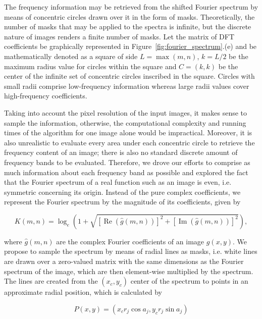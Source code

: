 The frequency information may be retrieved from the shifted Fourier spectrum by means of concentric circles drawn over it in the form of masks. Theoretically, the number of masks that may be applied to the spectra is infinite, but the discrete nature of images renders a finite number of masks. Let the matrix of DFT coefficients be graphically represented in Figure~\ref{fig:fourier_spectrum}.(e) and be mathematically denoted as a square of side $L = \max{(m,n)}$, $k = L / 2$ be the maximum radius value for circles within the square and $C = (k,k)$ be the center of the infinite set of concentric circles inscribed in the square. Circles with small radii comprise low-frequency information whereas large radii values cover high-frequency coefficients.

Taking into account the pixel resolution of the input images, it makes sense to sample the information, otherwise, the computational complexity and running times of the algorithm for one image alone would be impractical. Moreover, it is also unrealistic to evaluate every area under each concentric circle to retrieve the frequency content of an image; there is also no standard discrete amount of frequency bands to be evaluated. Therefore, we drove our efforts to comprise as much information about each frequency band as possible and explored the fact that the Fourier spectrum of a real function such as an image is even, i.e. symmetric concerning its origin. Instead of the pure complex coefficients, we represent the Fourier spectrum by the magnitude of its coefficients, given by

\begin{equation}
\label{eqn:magnitude_of_DFT}
K(m,n) = 
    \log_{e}{\left(1
    + \sqrt{
        [\operatorname{Re}{(\hat{g}(m,n))}]^{2}
        + [\operatorname{Im}{(\hat{g}(m,n))}]^{2}
      }
    \right)},
\end{equation}

\noindent where $\hat{g}(m,n)$ are the complex Fourier coefficients of an image $g(x,y)$. We propose to sample the spectrum by means of radial lines as masks, i.e. white lines are drawn over a zero-valued matrix with the same dimensions as the Fourier spectrum of the image, which are then element-wise multiplied by the spectrum. The lines are created from the $(x_{c},y_{c})$ center of the spectrum to points in an approximate radial position, which is calculated by

\begin{equation}
\label{eqn:points_on_radii}
P(x,y) = 
    (
    x_{c} r_{j} \cos{a_{j}}, 
    y_{c} r_{j} \sin{a_{j}}
    )
\end{equation}

